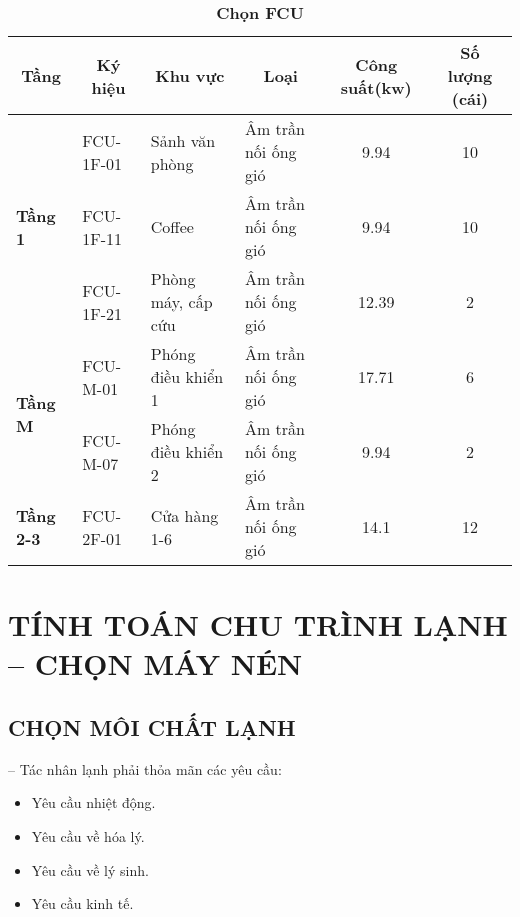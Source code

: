 \newpage
\begin{table}[H]
	\centering
	\caption{\textbf{Chọn FCU}}
	\begin{tabular}{|l|l|l|p{5.3em}|c|c|}
		\hline
		\multicolumn{1}{|c|}{\textbf{Tầng}} & \multicolumn{1}{c|}{\textbf{Ký hiệu}} & \multicolumn{1}{c|}{\textbf{Khu vực}} & \multicolumn{1}{c|}{\textbf{Loại}} & \multicolumn{1}{p{4.85em}|}{\textbf{Công suất\newline{}(kw)}} & \multicolumn{1}{p{4.25em}|}{\textbf{Số lượng \newline{}(cái)}} \bigstrut\\
		\hline
		\multirow{3}[6]{*}{\textbf{Tầng 1}} & FCU-1F-01 & Sảnh văn phòng & Âm trần nối\newline{} ống gió & 9.94  & 10 \bigstrut\\
		\cline{2-6}      & FCU-1F-11 & Coffee & Âm trần nối \newline{}ống gió & 9.94  & 10 \bigstrut\\
		\cline{2-6}      & FCU-1F-21 & \multicolumn{1}{p{8.55em}|}{Phòng máy, \newline{}cấp cứu} & Âm trần nối \newline{}ống gió & 12.39 & 2 \bigstrut\\
		\hline
		\multirow{2}[4]{*}{\textbf{Tầng M}} & FCU-M-01 & Phóng điều khiển 1 & Âm trần nối \newline{}ống gió & 17.71 & 6 \bigstrut\\
		\cline{2-6}      & FCU-M-07 & Phóng điều khiển 2 & Âm trần nối \newline{}ống gió & 9.94  & 2 \bigstrut\\
		\hline
		\textbf{Tầng 2-3} & FCU-2F-01 & Cửa hàng 1-6 & Âm trần nối \newline{}ống gió & 14.1  & 12 \bigstrut\\
		\hline
	\end{tabular}%
	
	
\end{table}

\section{TÍNH TOÁN CHU TRÌNH LẠNH – CHỌN MÁY NÉN}
\subsection{CHỌN MÔI CHẤT LẠNH}
-- Tác nhân lạnh phải thỏa mãn các yêu cầu:
\begin{itemize}
	\item Yêu cầu nhiệt động.
	\item Yêu cầu về hóa lý.
	\item Yêu cầu về lý sinh.
	\item Yêu cầu kinh tế.
\end{itemize}


